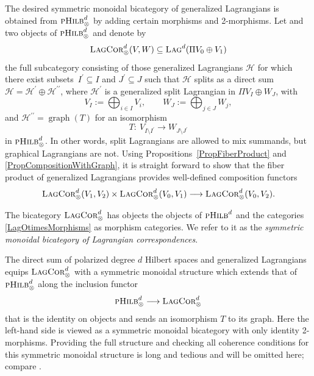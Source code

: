 \documentclass[pdftex]{sigma}
\numberwithin{equation}{section}
\DeclareMathOperator{\graph}{\mathrm{graph}}
\newcommand{\Lag}{\textsc{Lag}}
\newcommand{\LagCor}{\textsc{LagCor}}
\newcommand{\pHilb}{\textsc{pHilb}}
\begin{document}
The desired symmetric monoidal bicategory of generalized Lagrangians is obtained from $\pHilb^d_\otimes$ by adding certain morphisms and 2-morphisms.
Let  and  two objects of $\pHilb^d_\otimes$ and denote by
\begin{equation}
\label{LagOtimesMorphisms}
\LagCor^d_{\otimes}(V, W) \subseteq \Lag^d(\Pi V_0 \oplus V_1)
\end{equation}
the full subcategory consisting of those generalized Lagrangians $\mathcal{H}$ for which there exist subsets~${I^\prime \subseteq I}$ and $J^\prime \subseteq J$ such that $\mathcal{H}$ splits as a direct sum $\mathcal{H} = \mathcal{H}^\prime \oplus \mathcal{H}^{\prime\prime}$, where $\mathcal{H}^\prime$ is a generalized split Lagrangian in $\Pi V_I \oplus W_J$, with
 \begin{equation*}
 V_I := \bigoplus_{i \in I} V_i, \qquad W_J := \bigoplus_{j \in J} W_j,
 \end{equation*}
 and $\mathcal{H}^{\prime\prime} = \graph(T)$ for an isomorphism
 \[T\colon \ V_{I \setminus I^\prime} \to W_{J \setminus J^\prime}\]
 in $\pHilb^d_\otimes$.
 In other words, split Lagrangians are allowed to mix summands, but graphical Lagrangians are not.
 Using Propositions~\ref{PropFiberProduct} and \ref{PropCompositionWithGraph}, it is straight forward to show that the fiber product of generalized Lagrangians provides well-defined composition functors
 \begin{equation*}
 \LagCor^d_{\otimes}(V_1, V_2) \times\LagCor^d_{\otimes}(V_0, V_1) \longrightarrow \LagCor^d_{\otimes}(V_0, V_2).
 \end{equation*}

\begin{Definition}
 The bicategory $\LagCor^d_{\otimes}$ has objects the objects of $\pHilb^d$ and the categories \eqref{LagOtimesMorphisms} as morphism categories.
 We refer to it as the \emph{symmetric monoidal bicategory of Lagrangian correspondences}.
\end{Definition}

The direct sum of polarized degree $d$ Hilbert spaces and generalized Lagrangians equips $\LagCor^d_\otimes$ with a symmetric monoidal structure which extends that of $\pHilb_\otimes^d$ along the inclusion functor
\begin{equation}
\label{InclusionPHilbTimes}
 \pHilb^d_\otimes \longrightarrow \LagCor^d_\otimes
\end{equation}
that is the identity on objects and sends an isomorphism $T$ to its graph.
Here the left-hand side is viewed as a symmetric monoidal bicategory with only identity 2-morphisms.
Providing the full structure and checking all coherence conditions for this symmetric monoidal structure is long and tedious and will be omitted here; compare \cite{Schommer-Pries}.
\end{document}
